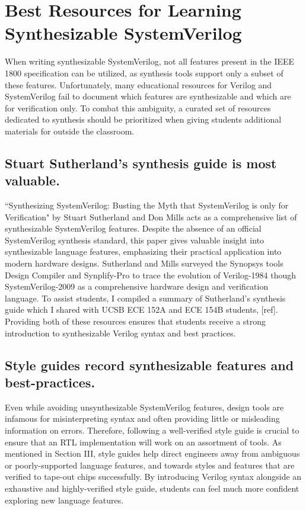 
\chapter{Best Resources for Learning Synthesizable SystemVerilog}
\label{chapter:resources}

When writing synthesizable SystemVerilog, not all features present in the IEEE 1800 specification can be utilized, as synthesis tools support only a subset of these features. Unfortunately, many educational resources for Verilog and SystemVerilog fail to document which features are synthesizable and which are for verification only. To combat this ambiguity, a curated set of resources dedicated to synthesis should be prioritized when giving students additional materials for outside the classroom.

\section{Stuart Sutherland's synthesis guide is most valuable.}

``Synthesizing SystemVerilog: Busting the Myth that SystemVerilog is only for Verification" by Stuart Sutherland and Don Mills acts as a comprehensive list of synthesizable SystemVerilog features. Despite the absence of an official SystemVerilog synthesis standard, this paper gives valuable insight into synthesizable language features, emphasizing their practical application into modern hardware designs. Sutherland and Mills surveyed the Synopsys tools Design Compiler and Synplify-Pro to trace the evolution of Verilog-1984 though SystemVerilog-2009 as a comprehensive hardware design and verification language. To assist students, I compiled a summary of Sutherland's synthesis guide which I shared with UCSB ECE 152A and ECE 154B students, [ref]. Providing both of these resources ensures that students receive a strong introduction to synthesizable Verilog syntax and best practices.

\section{Style guides record synthesizable features and best-practices.}

Even while avoiding unsynthesizable SystemVerilog features, design tools are infamous for misinterpreting syntax and often providing little or misleading information on errors. Therefore, following a well-verified style guide is crucial to ensure that an RTL implementation will work on an assortment of tools. As mentioned in Section III, style guides help direct engineers away from ambiguous or poorly-supported language features, and towards styles and features that are verified to tape-out chips successfully. By introducing Verilog syntax alongside an exhaustive and highly-verified style guide, students can feel much more confident exploring new language features.

